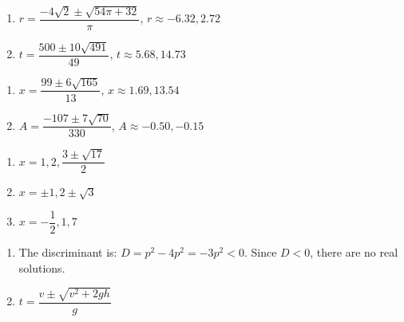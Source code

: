 \documentclass{ximera}
\begin{document}
\begin{multicols}{2}
\begin{enumerate}
\setcounter{enumi}{\value{HW}}
\item $r = \dfrac{-4\sqrt{2} \pm \sqrt{54\pi + 32}}{\pi}$, $r \approx -6.32, 2.72$
\item $t = \dfrac{500 \pm 10\sqrt{491}}{49}$, $t \approx 5.68, 14.73$


\setcounter{HW}{\value{enumi}}
\end{enumerate}
\end{multicols}

\begin{multicols}{2}
\begin{enumerate}
\setcounter{enumi}{\value{HW}}

\item $x = \dfrac{99 \pm 6 \sqrt{165}}{13}$, $x \approx 1.69, 13.54$
\item $A = \dfrac{-107 \pm 7 \sqrt{70}}{330}$, $A \approx -0.50, -0.15$

\setcounter{HW}{\value{enumi}}
\end{enumerate}
\end{multicols}







\begin{multicols}{3}
\begin{enumerate}
\setcounter{enumi}{\value{HW}}

\item $x = 1, 2, \dfrac{3 \pm \sqrt{17}}{2}$
\item $x = \pm 1, 2 \pm \sqrt{3}$ 
\item $x = -\dfrac{1}{2}, 1, 7$

\setcounter{HW}{\value{enumi}}
\end{enumerate}
\end{multicols}

\begin{enumerate}
\setcounter{enumi}{\value{HW}}

\item The discriminant is: $D = p^2 - 4p^2 = -3p^2 < 0$.  Since $D < 0$, there are no real solutions.  

\item $t = \dfrac{v \pm \sqrt{v^2 + 2gh}}{g}$

\setcounter{HW}{\value{enumi}}
\end{enumerate}
\end{document}
